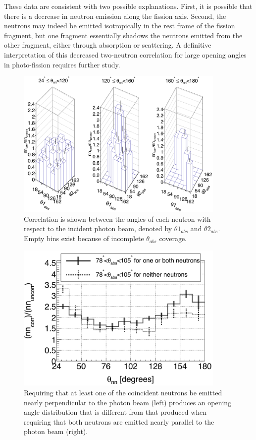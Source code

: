 These data are consistent with two possible explanations.
First, it is possible that there is a decrease in neutron emission along the fission axis.
Second, the neutrons may indeed be emitted isotropically in the rest frame of the fission fragment, but one fragment essentially shadows the neutrons emitted from the other fragment, either through absorption or scattering.
A definitive interpretation of this decreased two-neutron correlation for large opening angles in photo-fission requires further study.

\begin{figure}
    \includegraphics[width = 0.9\textwidth]{Content/Results/theta_abs_LEGO.png}
    \caption{Correlation is shown between the angles of each neutron with respect to the incident photon beam, denoted by $\theta 1_{abs}$ and $\theta 2_{abs}$.
    Empty bins exist because of incomplete $\theta_{abs}$ coverage.}
    \label{fig:theta_abs_LEGO}
\end{figure}
\begin{figure}
\includegraphics[width=0.9\textwidth]{Content/Results/theta_abs_two-neutron.png}
\caption{Requiring that at least one of the coincident neutrons be emitted nearly perpendicular to the photon beam (left) produces an opening angle distribution that is different from that produced when requiring that both neutrons are emitted nearly parallel to the photon beam (right).}
\label{fig:theta_abs_two_neutron}
\end{figure}

\FloatBarrier 
